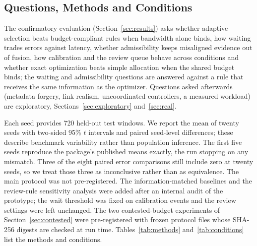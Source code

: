 \documentclass[conference,a4paper]{IEEEtran}
\newif\ifsubmission
\begin{document}
\subsection{Questions, Methods and Conditions}
The confirmatory evaluation (Section~\ref{sec:results}) asks whether adaptive selection beats budget-compliant rules when bandwidth alone binds, how waiting trades errors against latency, whether admissibility keeps misaligned evidence out of fusion, how calibration and the review queue behave across conditions and whether exact optimization beats simple allocation when the shared budget binds; the waiting and admissibility questions are answered against a rule that receives the same information as the optimizer. Questions asked afterwards (metadata forgery, link realism, uncoordinated controllers, a measured workload) are exploratory, Sections~\ref{sec:exploratory} and~\ref{sec:real}.

Each seed provides 720 held-out test windows. We report the mean of twenty seeds with two-sided 95\% $t$ intervals and paired seed-level differences; these describe benchmark variability rather than population inference. The first five seeds reproduce the package's published means exactly, the run stopping on any mismatch. Three of the eight paired error comparisons still include zero at twenty seeds, so we treat those three as inconclusive rather than as equivalence. The main protocol was not pre-registered. The information-matched baselines and the review-rule sensitivity analysis were added after an internal audit of the prototype; the wait threshold was fixed on calibration events and the review settings were left unchanged. The two contested-budget experiments of Section~\ref{sec:contested} were pre-registered with frozen protocol files whose SHA-256 digests are checked at run time. \ifsubmission The package lists every method with its description and every condition with its exact manipulation.\else Tables~\ref{tab:methods} and~\ref{tab:conditions} list the methods and conditions.\fi
\end{document}
